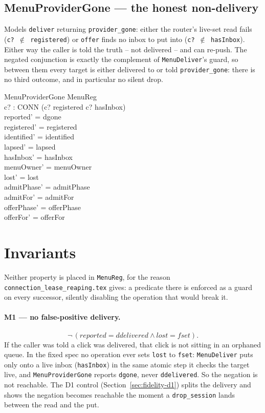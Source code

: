 \documentclass[a4paper,10pt,fleqn]{article}
\begin{document}
\subsection{MenuProviderGone --- the honest non-delivery}
\label{sec:providergone}

Models \texttt{deliver} returning \texttt{provider\_gone}: either the
router's live-set read fails (\texttt{c? $\notin$ registered}) or
\texttt{offer} finds no inbox to put into (\texttt{c? $\notin$ hasInbox}).
Either way the caller is told the truth -- not delivered -- and can re-push.
The negated conjunction is exactly the complement of \texttt{MenuDeliver}'s
guard, so between them every target is either delivered to or told
\texttt{provider\_gone}: there is no third outcome, and in particular no
silent drop.

\begin{schema}{MenuProviderGone}
  \Delta MenuReg \\
  c? : CONN
\where
  \lnot (c? \in registered \land c? \in hasInbox) \\
  reported' = dgone \\
  registered' = registered \\
  identified' = identified \\
  lapsed' = lapsed \\
  hasInbox' = hasInbox \\
  menuOwner' = menuOwner \\
  lost' = lost \\
  admitPhase' = admitPhase \\
  admitFor' = admitFor \\
  offerPhase' = offerPhase \\
  offerFor' = offerFor
\end{schema}

\section{Invariants}
\label{sec:inv}

Neither property is placed in \texttt{MenuReg}, for the reason
\texttt{connection\_lease\_reaping.tex} gives: a predicate there is enforced
as a guard on every successor, silently disabling the operation that would
break it.

\paragraph{M1 --- no false-positive delivery.}
\[
  \lnot\, (reported = ddelivered \land lost = fset).
\]
If the caller was told a click was delivered, that click is not sitting in
an orphaned queue. In the fixed spec no operation ever sets \texttt{lost} to
\texttt{fset}: \texttt{MenuDeliver} puts only onto a live inbox
(\texttt{hasInbox}) in the same atomic step it checks the target live, and
\texttt{MenuProviderGone} reports \texttt{dgone}, never \texttt{ddelivered}.
So the negation is not reachable. The D1 control
(Section~\ref{sec:fidelity-d1}) splits the delivery and shows the negation
becomes reachable the moment a \texttt{drop\_session} lands between the read
and the put.
\end{document}
